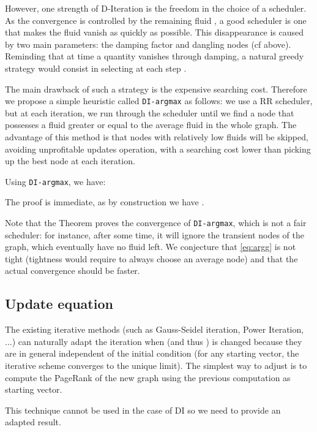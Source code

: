 \documentclass{llncs}
\begin{document}
However, one strength of D-Iteration is the freedom in the choice of a scheduler. As the convergence is controlled by the remaining fluid , a good scheduler is one that makes the fluid vanish as quickly as possible. This disappearance is caused by two main parameters: the damping factor  and dangling nodes (cf above). Reminding that at time  a quantity  vanishes through damping, a natural greedy strategy would consist in selecting at each step .

The main drawback of such a strategy is the expensive searching cost. Therefore we propose a simple heuristic called \texttt{DI-argmax} as follows: we use a RR scheduler, but at each iteration, we run through the scheduler until we find a node that possesses a fluid greater or equal to the average fluid in the whole graph. The advantage of this method is that nodes with relatively low fluids will be skipped, avoiding unprofitable updates operation, with a searching cost lower than picking up the best node at each iteration.

\begin{theorem}
\label{thm:argmax}
Using \texttt{DI-argmax}, we have: 


\end{theorem}

The proof is immediate, as by construction we have .

Note that the Theorem proves the convergence of \texttt{DI-argmax}, which is not a fair scheduler: for instance, after some time, it will ignore the transient nodes of the graph, which eventually have no fluid left. We conjecture that \eqref{eq:argg} is not tight (tightness would require to always choose an average node) and that the actual convergence should be faster. 




\subsection{Update equation}

The existing iterative methods (such as Gauss-Seidel iteration, Power Iteration, ...) can naturally adapt the iteration when  (and thus ) is changed because they are in general independent of the initial condition (for any starting vector, the iterative scheme converges to the unique limit). The simplest way to adjust is to compute the PageRank of the new graph using the previous computation as starting vector.

This technique cannot be used in the case of DI so we need to provide an adapted result.
\end{document}
